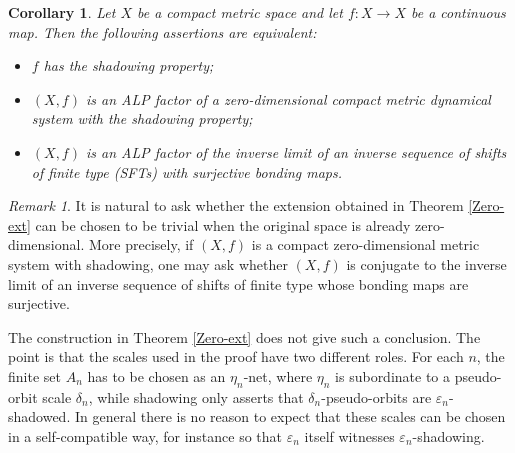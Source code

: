 \documentclass[12pt]{amsart}
\newtheorem{corollary}[theorem]{Corollary}
\theoremstyle{definition}
\numberwithin{equation}{section}
\theoremstyle{remark}
\newtheorem{remark}[theorem]{Remark}
\begin{document}
\begin{corollary}\label{metc}
Let $X$ be a compact metric space and let $f: X\to X$ be a continuous map. Then the following assertions are equivalent:
\begin{itemize}
    \item $f$ has the shadowing property;
    \item $(X, f)$ is an ALP factor of a zero-dimensional compact metric dynamical system with the shadowing property;
    \item $(X, f)$ is an ALP factor of the inverse limit of an inverse sequence of shifts of finite type (SFTs) with surjective bonding maps.
\end{itemize}
\end{corollary}



\begin{remark}
It is natural to ask whether the extension obtained in Theorem \ref{Zero-ext}
can be chosen to be trivial when the original space is already
zero-dimensional. More precisely, if $(X,f)$ is a compact zero-dimensional
metric system with shadowing, one may ask whether $(X,f)$ is conjugate to the
inverse limit of an inverse sequence of shifts of finite type whose bonding
maps are surjective.

The construction in Theorem \ref{Zero-ext} does not give such a conclusion.
The point is that the scales used in the proof have two different roles. For
each $n$, the finite set $A_n$ has to be chosen as an $\eta_n$-net, where
$\eta_n$ is subordinate to a pseudo-orbit scale $\delta_n$, while shadowing only
asserts that $\delta_n$-pseudo-orbits are $\varepsilon_n$-shadowed. In general
there is no reason to expect that these scales can be chosen in a
self-compatible way, for instance so that $\varepsilon_n$ itself witnesses
$\varepsilon_n$-shadowing.
\end{remark}
\end{document}
